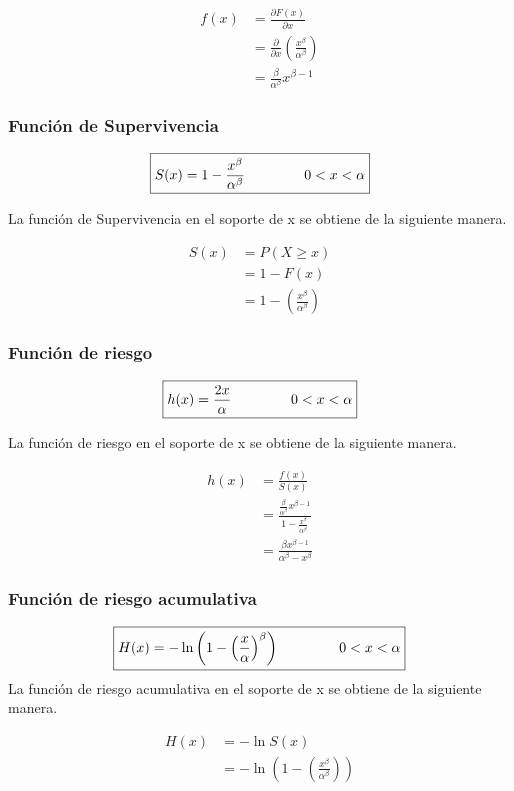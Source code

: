 \documentclass[10pt,a4paper]{article}
\begin{document}
\begin{align*}
f(x) &= \frac{\partial F(x)}{\partial x}	 \\
	&=	\frac{\partial}{\partial x} \left( \frac{x^\beta}{\alpha^\beta} \right)\\
	&= \frac{\beta}{\alpha^\beta} x^{\beta -1}
\end{align*}

\subsubsection*{Funci\'on de Supervivencia}
\begin{equation*}
\boxed{
S(x) = 1 - \frac{x^\beta}{\alpha^\beta} \hspace{1.5cm} 0<x<\alpha}
\end{equation*}

La función de Supervivencia en el soporte de x se obtiene de la siguiente manera.

\begin{align*}
S(x) &= P(X \geqslant x) \\
     &= 1 - F(x) \\
     &= 1 - \left(\frac{x^\beta}{\alpha^\beta} \right) 
\end{align*}

\subsubsection*{Funci\'on de riesgo}
\begin{equation*}
\boxed{
h(x) = \frac{2x}{\alpha} \hspace{1.5cm} 0<x<\alpha}
\end{equation*}

La función de riesgo en el soporte de x se obtiene de la siguiente manera.

\begin{align*}
h(x) &= \frac{f(x)}{S(x)} \\
     &= \frac{\frac{\beta}{\alpha^\beta} x^{\beta -1}}{1 - \frac{x^\beta}{\alpha^\beta}} \\
     &= \frac{\beta x^{\beta-1}}{\alpha^\beta - x^\beta}
\end{align*}

\subsubsection*{Funci\'on de riesgo acumulativa}
\begin{equation*}
\boxed{
H(x) = - \ln \left( 1 - \left(\frac{x}{\alpha} \right) ^\beta \right)   \hspace{1.5cm} 0 < x <\alpha}
\end{equation*}
La función de riesgo acumulativa en el soporte de x se obtiene de la siguiente manera.

\begin{align*}
H(x) &= -\ln S(x) \\
     &= - \ln \left( 1 - \left(\frac{x^\beta}{\alpha^\beta} \right) \right)  
\end{align*}
\end{document}
